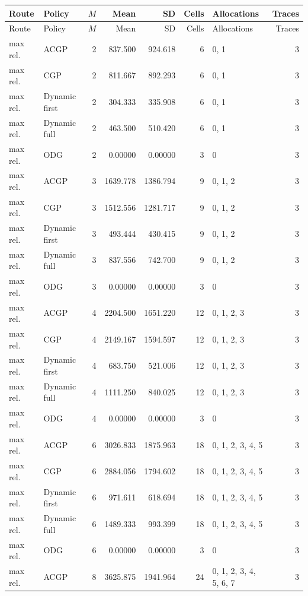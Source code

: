 \documentclass[10pt,a4paper]{article}
\begin{document}
\tiny\setlength{\tabcolsep}{2pt}\begin{longtable}{@{}p{23mm}p{29mm}rrrrp{36mm}r@{}}
\toprule Route & Policy & $M$ & Mean & SD & Cells & Allocations & Traces \\ \midrule\endfirsthead
\toprule Route & Policy & $M$ & Mean & SD & Cells & Allocations & Traces \\ \midrule\endhead
\bottomrule\endfoot
max rel. & ACGP & 2 & 837.500 & 924.618 & 6 & 0, 1 & 3 \\
max rel. & CGP & 2 & 811.667 & 892.293 & 6 & 0, 1 & 3 \\
max rel. & Dynamic first & 2 & 304.333 & 335.908 & 6 & 0, 1 & 3 \\
max rel. & Dynamic full & 2 & 463.500 & 510.420 & 6 & 0, 1 & 3 \\
max rel. & ODG & 2 & 0.00000 & 0.00000 & 3 & 0 & 3 \\
max rel. & ACGP & 3 & 1639.778 & 1386.794 & 9 & 0, 1, 2 & 3 \\
max rel. & CGP & 3 & 1512.556 & 1281.717 & 9 & 0, 1, 2 & 3 \\
max rel. & Dynamic first & 3 & 493.444 & 430.415 & 9 & 0, 1, 2 & 3 \\
max rel. & Dynamic full & 3 & 837.556 & 742.700 & 9 & 0, 1, 2 & 3 \\
max rel. & ODG & 3 & 0.00000 & 0.00000 & 3 & 0 & 3 \\
max rel. & ACGP & 4 & 2204.500 & 1651.220 & 12 & 0, 1, 2, 3 & 3 \\
max rel. & CGP & 4 & 2149.167 & 1594.597 & 12 & 0, 1, 2, 3 & 3 \\
max rel. & Dynamic first & 4 & 683.750 & 521.006 & 12 & 0, 1, 2, 3 & 3 \\
max rel. & Dynamic full & 4 & 1111.250 & 840.025 & 12 & 0, 1, 2, 3 & 3 \\
max rel. & ODG & 4 & 0.00000 & 0.00000 & 3 & 0 & 3 \\
max rel. & ACGP & 6 & 3026.833 & 1875.963 & 18 & 0, 1, 2, 3, 4, 5 & 3 \\
max rel. & CGP & 6 & 2884.056 & 1794.602 & 18 & 0, 1, 2, 3, 4, 5 & 3 \\
max rel. & Dynamic first & 6 & 971.611 & 618.694 & 18 & 0, 1, 2, 3, 4, 5 & 3 \\
max rel. & Dynamic full & 6 & 1489.333 & 993.399 & 18 & 0, 1, 2, 3, 4, 5 & 3 \\
max rel. & ODG & 6 & 0.00000 & 0.00000 & 3 & 0 & 3 \\
max rel. & ACGP & 8 & 3625.875 & 1941.964 & 24 & 0, 1, 2, 3, 4, 5, 6, 7 & 3 \\

\end{longtable}
\end{document}
